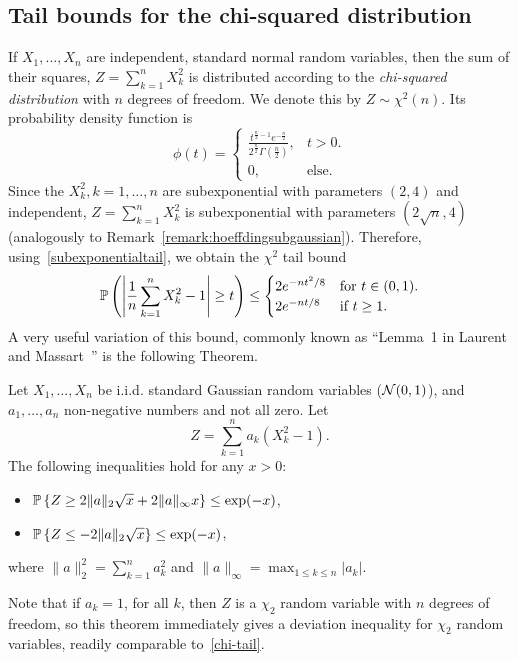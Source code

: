 \subsection{Tail bounds for the chi-squared distribution}


If $X_1,\dots,X_n$ are independent, standard normal random variables, then the sum of their squares,
$Z = \sum_{k=1}^n X_k^2$ is distributed according to the {\em chi-squared distribution} with $n$ degrees of freedom. We denote this  by
$Z \sim \chi^2(n)$. Its probability density function is
$$
\phi(t) =
\begin{cases}
 \frac{t^{\frac{n}{2}-1} e^{-\frac{n}{2}}}{{ 2^{\frac{n}{2}} \Gamma(\frac{n}{2})}},  &   t > 0. \\
0, & \text{else.}
\end{cases}
$$
Since the  $X_k^2, k=1,\dots,n$ are subexponential with parameters $(2,4)$ and independent, $Z = \sum_{k=1}^n X_k^2$ is subexponential with
parameters $(2\sqrt{n},4)$ (analogously to Remark~\ref{remark:hoeffdingsubgaussian}). Therefore, using~\eqref{subexponentialtail}, we obtain the $\chi^2$ tail bound
\begin{equation}\label{chi-tail}
\P \left(   \left| \frac{1}{n} \sum_{k=1}^n X_k^2 - 1 \right| \ge t \right) \le
\begin{cases}
2 e^{-nt^2/8} & \text{for $t \in (0,1)$.} \\
2e^{-nt/8} & \text{if $t \ge 1$.}  \\
\end{cases}
\end{equation}
A very useful variation of this bound, commonly known as ``Lemma~1 in Laurent and Massart~\cite{Laurent_Massart_TailChiSquare}'' is the following Theorem.%








\begin{theorem}\label{thm:chisquare_concentration}
 Let $X_1,\dots,X_n$ be i.i.d. standard Gaussian random variables ($\NNN(0,1)$), and $a_1,\dots,a_n$ non-negative numbers and not all zero. Let
 \[
 Z = \sum_{k=1}^n a_k\left( X_k^2  - 1  \right).
 \]
 The following inequalities hold for any $x>0$:
 \begin{itemize}
 \item $\Prob\left\{ Z \geq 2\|a\|_2 \sqrt{x} + 2\|a\|_\infty x  \right\} \leq \exp(-x)$,
 \item $\Prob\left\{ Z \leq -2\|a\|_2 \sqrt{x}  \right\} \leq \exp(-x)$,
 \end{itemize}
 where $\|a\|_2^2 = \sum_{k=1}^n a_k^2$ and $\|a\|_\infty = \max_{1\leq k\leq n}|a_k|$.

\end{theorem}
Note that if $a_k=1$, for all $k$, then $Z$ is a $\chi_2$ random variable with $n$ degrees of freedom, so this theorem immediately gives a deviation inequality for $\chi_2$ random variables, readily comparable to~\eqref{chi-tail}.

